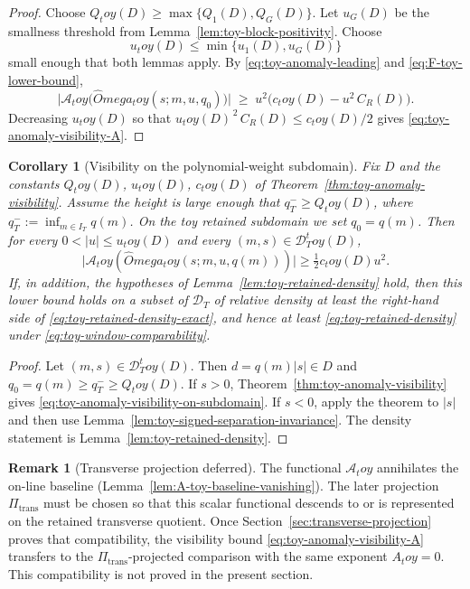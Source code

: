 \documentclass[11pt,a4paper]{amsart}
\def\Omega{Omega}%
\def\toy{toy}%
\numberwithin{equation}{section}
\theoremstyle{plain}
\newtheorem{corollary}[theorem]{Corollary}
\theoremstyle{definition}
\newtheorem{remark}[theorem]{Remark}
\newcommand{\Om}{\Omega}
\newcommand{\toy}{\mathrm{toy}}
\newcommand{\trans}{\mathrm{trans}}
\begin{document}
\begin{proof}
Choose \(Q_\toy(D)\ge\max\{Q_1(D),Q_G(D)\}\).  Let \(u_G(D)\) be the
smallness threshold from Lemma~\ref{lem:toy-block-positivity}.  Choose
\[
        u_\toy(D)\le \min\{u_1(D),u_G(D)\}
\]
small enough that both lemmas apply.  By
\eqref{eq:toy-anomaly-leading} and \eqref{eq:F-toy-lower-bound},
\[
\bigl|\mathcal A_\toy\bigl(\widehat\Om_\toy(s;m,u,q_0)\bigr)\bigr|
\;\ge\;
u^2\bigl(c_\toy(D)-u^2\,C_R(D)\bigr).
\]
Decreasing \(u_\toy(D)\) so that \(u_\toy(D)^{\,2}\,C_R(D)\le c_\toy(D)/2\) gives
\eqref{eq:toy-anomaly-visibility-A}.
\end{proof}

\begin{corollary}[Visibility on the polynomial-weight subdomain]
\label{cor:toy-visibility-polynomial-weight}
Fix \(D\) and the constants \(Q_\toy(D)\), \(u_\toy(D)\), \(c_\toy(D)\)
of Theorem~\ref{thm:toy-anomaly-visibility}.  Assume the height is large
enough that \(q_T^-\ge Q_\toy(D)\), where
\(q_T^-:=\inf_{m\in I_T}q(m)\).  On the toy retained subdomain we set
\(q_0=q(m)\).  Then for every \(0<|u|\le
u_\toy(D)\) and every \((m,s)\in\mathcal D_T^\toy(D)\),
\begin{equation}
\label{eq:toy-anomaly-visibility-on-subdomain}
        \bigl|\mathcal A_\toy(\widehat\Om_\toy(s;m,u,q(m)))\bigr|
        \ge \tfrac12 c_\toy(D)u^2.
\end{equation}
If, in addition, the hypotheses of Lemma~\ref{lem:toy-retained-density}
hold, then this lower bound holds on a subset of \(\mathcal D_T\) of
relative density at least the right-hand side of
\eqref{eq:toy-retained-density-exact}, and hence at least
\eqref{eq:toy-retained-density} under
\eqref{eq:toy-window-comparability}.
\end{corollary}

\begin{proof}
Let \((m,s)\in\mathcal D_T^\toy(D)\).  Then
\(d=q(m)|s|\in D\) and \(q_0=q(m)\ge q_T^-\ge Q_\toy(D)\).  If
\(s>0\), Theorem~\ref{thm:toy-anomaly-visibility} gives
\eqref{eq:toy-anomaly-visibility-on-subdomain}.  If \(s<0\), apply the
theorem to \(|s|\) and then use
Lemma~\ref{lem:toy-signed-separation-invariance}.  The density statement
is Lemma~\ref{lem:toy-retained-density}.
\end{proof}

\begin{remark}[Transverse projection deferred]
\label{rem:toy-Pi-trans-deferred}
The functional \(\mathcal A_\toy\) annihilates the on-line baseline
(Lemma~\ref{lem:A-toy-baseline-vanishing}).  The later projection
\(\Pi_\trans\) must be chosen so that this scalar functional descends to
or is represented on the retained transverse quotient.  Once
Section~\ref{sec:transverse-projection} proves that compatibility, the
visibility bound \eqref{eq:toy-anomaly-visibility-A} transfers to the
\(\Pi_\trans\)-projected comparison with the same exponent
\(A_\toy=0\).  This compatibility is not proved in the present section.
\end{remark}
\end{document}
